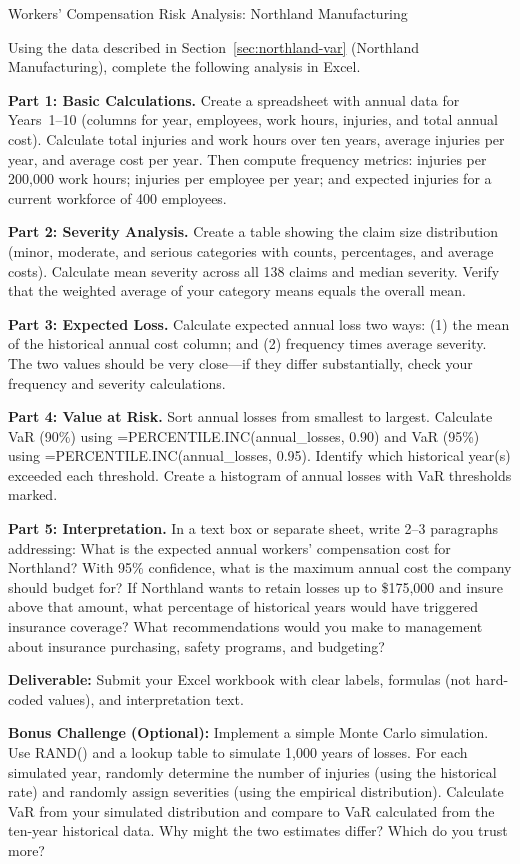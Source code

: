 \documentclass[11pt,openany]{book}
\newcommand{\excelcode}[1]{{\small\ttfamily #1}}
\begin{document}
\begin{minicase}{Workers' Compensation Risk Analysis: Northland Manufacturing}

Using the data described in Section~\ref{sec:northland-var} (Northland
Manufacturing), complete the following analysis in Excel.

\textbf{Part 1: Basic Calculations.} Create a spreadsheet with annual data for
Years~1--10 (columns for year, employees, work hours, injuries, and total
annual cost). Calculate total injuries and work hours over ten years, average
injuries per year, and average cost per year. Then compute frequency metrics:
injuries per 200,000 work hours; injuries per employee per year; and expected
injuries for a current workforce of 400 employees.

\textbf{Part 2: Severity Analysis.} Create a table showing the claim size
distribution (minor, moderate, and serious categories with counts, percentages,
and average costs). Calculate mean severity across all 138 claims and median
severity. Verify that the weighted average of your category means equals the
overall mean.

\textbf{Part 3: Expected Loss.} Calculate expected annual loss two ways:
(1) the mean of the historical annual cost column; and (2) frequency times
average severity. The two values should be very close---if they differ
substantially, check your frequency and severity calculations.

\textbf{Part 4: Value at Risk.} Sort annual losses from smallest to largest.
Calculate VaR (90\%) using
\excelcode{=PERCENTILE.INC(annual\_losses, 0.90)} and VaR (95\%) using
\excelcode{=PERCENTILE.INC(annual\_losses, 0.95)}. Identify which historical
year(s) exceeded each threshold. Create a histogram of annual losses with VaR
thresholds marked.

\textbf{Part 5: Interpretation.} In a text box or separate sheet, write
2--3 paragraphs addressing: What is the expected annual workers' compensation
cost for Northland? With 95\% confidence, what is the maximum annual cost the
company should budget for? If Northland wants to retain losses up to \$175,000
and insure above that amount, what percentage of historical years would have
triggered insurance coverage? What recommendations would you make to management
about insurance purchasing, safety programs, and budgeting?

\medskip
\textbf{Deliverable:} Submit your Excel workbook with clear labels, formulas
(not hard-coded values), and interpretation text.

\medskip
\textbf{Bonus Challenge (Optional):} Implement a simple Monte Carlo simulation.
Use \excelcode{RAND()} and a lookup table to simulate 1,000 years of losses.
For each simulated year, randomly determine the number of injuries (using the
historical rate) and randomly assign severities (using the empirical
distribution). Calculate VaR from your simulated distribution and compare to
VaR calculated from the ten-year historical data. Why might the two estimates
differ? Which do you trust more?

\end{minicase}
\end{document}
